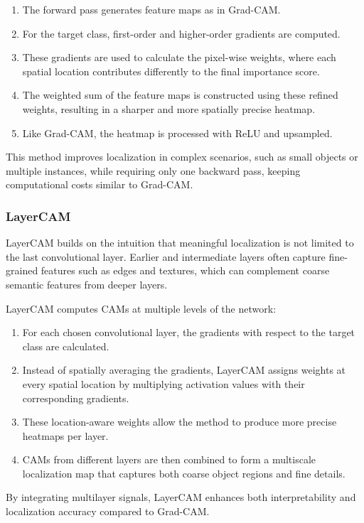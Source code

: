 \begin{enumerate}
    \item The forward pass generates feature maps as in Grad-CAM.
    \item For the target class, first-order and higher-order gradients are computed.
    \item These gradients are used to calculate the pixel-wise weights, where each spatial location contributes differently to the final importance score.
    \item The weighted sum of the feature maps is constructed using these refined weights, resulting in a sharper and more spatially precise heatmap.
    \item Like Grad-CAM, the heatmap is processed with ReLU and upsampled.
\end{enumerate}

This method improves localization in complex scenarios, such as small objects or multiple instances, while requiring only one backward pass, keeping computational costs similar to Grad-CAM.

\subsubsection{LayerCAM}
LayerCAM\cite{layer_cam} builds on the intuition that meaningful localization is not limited to the last convolutional layer. Earlier and intermediate layers often capture fine-grained features such as edges and textures, which can complement coarse semantic features from deeper layers.

LayerCAM\cite{layer_cam} computes CAMs at multiple levels of the network:
\begin{enumerate}
    \item For each chosen convolutional layer, the gradients with respect to the target class are calculated.
    \item Instead of spatially averaging the gradients, LayerCAM\cite{layer_cam} assigns weights at every spatial location by multiplying activation values with their corresponding gradients.
    \item These location-aware weights allow the method to produce more precise heatmaps per layer.
    \item CAMs from different layers are then combined to form a multiscale localization map that captures both coarse object regions and fine details.
\end{enumerate}

By integrating multilayer signals, LayerCAM\cite{layer_cam} enhances both interpretability and localization accuracy compared to Grad-CAM.

